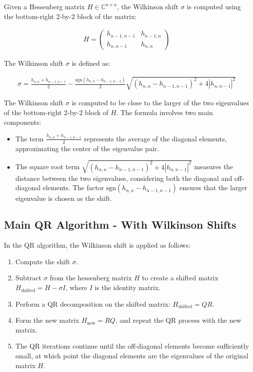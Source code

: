 \documentclass[12pt]{article}
\numberwithin{equation}{subsubsection}
\begin{document}
Given a Hessenberg matrix $ H \in \mathbb{C}^{n \times n} $, the Wilkinson shift $ \sigma $ is computed using the bottom-right 2-by-2 block of the matrix:

\begin{align}
	H = \begin{pmatrix}
	h_{n-1,n-1} & h_{n-1,n} \\
	h_{n,n-1} & h_{n,n}
	\end{pmatrix}
\end{align}

The Wilkinson shift $ \sigma $ is defined as:

\begin{align}
	\sigma = \frac{h_{n,n} + h_{n-1,n-1}}{2} - \frac{\text{sgn}(h_{n,n} - h_{n-1,n-1})}{2} \sqrt{(h_{n,n} - h_{n-1,n-1})^2 + 4|h_{n,n-1}|^2}
\end{align}

The Wilkinson shift $ \sigma $ is computed to be close to the larger of the two eigenvalues of the bottom-right 2-by-2 block of $ H $. The formula involves two main components:
\begin{itemize}
	\item The term $ \frac{h_{n,n} + h_{n-1,n-1}}{2} $ represents the average of the diagonal elements, approximating the center of the eigenvalue pair.
	\item The square root term $ \sqrt{(h_{n,n} - h_{n-1,n-1})^2 + 4|h_{n,n-1}|^2} $ measures the distance between the two eigenvalues, considering both the diagonal and off-diagonal elements. The factor $ \text{sgn}(h_{n,n} - h_{n-1,n-1}) $ ensures that the larger eigenvalue is chosen as the shift.
\end{itemize}

\subsection{Main QR Algorithm - With Wilkinson Shifts}
In the QR algorithm, the Wilkinson shift is applied as follows:
\begin{enumerate}
	\item Compute the shift $ \sigma $.
	\item Subtract $ \sigma $ from the hessenberg matrix $ H $ to create a shifted matrix $ H_{\text{shifted}} = H - \sigma I $, where $ I $ is the identity matrix.
	\item Perform a QR decomposition on the shifted matrix: $ H_{\text{shifted}} = Q R $.
	\item Form the new matrix $ H_{\text{new}} = R Q $, and repeat the QR process with the new matrix.
	\item The QR iterations continue until the off-diagonal elements become sufficiently small, at which point the diagonal elements are the eigenvalues of the original matrix $ H $.
\end{enumerate}
\end{document}
